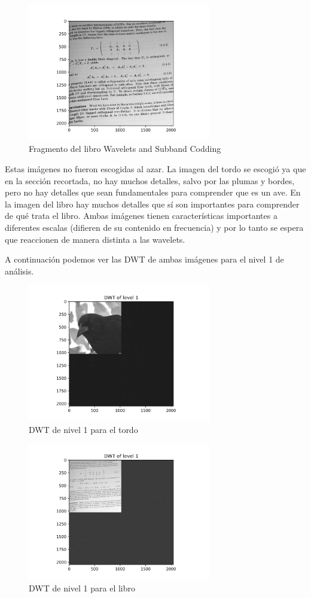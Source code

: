 \documentclass[conference]{IEEEtran}
\begin{document}
\begin{figure}[H]
\includegraphics[width=8cm]{images/book_cut.png}
\caption{Fragmento del libro Wavelets and Subband Codding}
\end{figure}


Estas imágenes no fueron escogidas al azar. La imagen del tordo se escogió ya que en la sección recortada, no hay muchos detalles, salvo por las plumas y bordes, pero no hay detalles que sean fundamentales para comprender que es un ave. En la imagen del libro hay muchos detalles que sí son importantes para comprender de qué trata el libro. Ambas imágenes tienen características importantes a diferentes escalas (difieren de su contenido en frecuencia) y por lo tanto se espera que reaccionen de manera distinta a las wavelets.


A continuación podemos ver las DWT de ambas imágenes para el nivel 1 de análisis.

\begin{figure}[H]
\includegraphics[width=8cm]{images/tordoDWT1.png}
\caption{DWT de nivel 1 para el tordo}
\end{figure}

\begin{figure}[H]
\includegraphics[width=8cm]{images/bookDWT1.png}
\caption{DWT de nivel 1 para el libro}
\end{figure}
\end{document}
